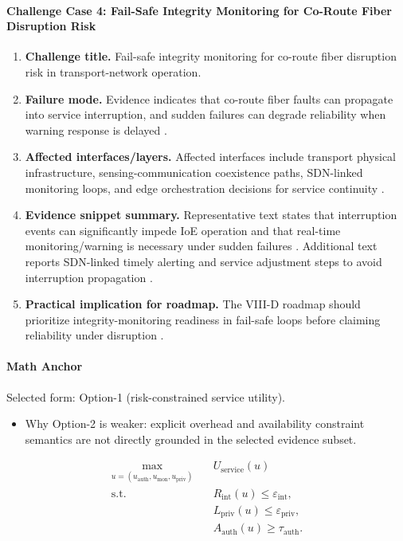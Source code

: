 \paragraph{Challenge Case 4: Fail-Safe Integrity Monitoring for Co-Route Fiber Disruption Risk}
\begin{enumerate}
    \item \textbf{Challenge title.} Fail-safe integrity monitoring for co-route fiber disruption risk in transport-network operation.
    \item \textbf{Failure mode.} Evidence indicates that co-route fiber faults can propagate into service interruption, and sudden failures can degrade reliability when warning response is delayed \cite{O_ISAC_041}.
    \item \textbf{Affected interfaces/layers.} Affected interfaces include transport physical infrastructure, sensing-communication coexistence paths, SDN-linked monitoring loops, and edge orchestration decisions for service continuity \cite{O_ISAC_041}.
    \item \textbf{Evidence snippet summary.} Representative text states that interruption events can significantly impede IoE operation and that real-time monitoring/warning is necessary under sudden failures \cite{O_ISAC_041}. Additional text reports SDN-linked timely alerting and service adjustment steps to avoid interruption propagation \cite{O_ISAC_041}.
    \item \textbf{Practical implication for roadmap.} The VIII-D roadmap should prioritize integrity-monitoring readiness in fail-safe loops before claiming reliability under disruption \cite{O_ISAC_041}.
\end{enumerate}

\paragraph{Math Anchor}
Selected form: Option-1 (risk-constrained service utility).
\begin{itemize}
    \item Why Option-2 is weaker: explicit overhead and availability constraint semantics are not directly grounded in the selected evidence subset.
\end{itemize}

\[
\begin{aligned}
\max_{u=(u_{\mathrm{auth}},u_{\mathrm{mon}},u_{\mathrm{priv}})} \quad & U_{\mathrm{service}}(u) \\
\text{s.t.} \quad & R_{\mathrm{int}}(u) \le \varepsilon_{\mathrm{int}}, \\
& L_{\mathrm{priv}}(u) \le \varepsilon_{\mathrm{priv}}, \\
& A_{\mathrm{auth}}(u) \ge \tau_{\mathrm{auth}}.
\end{aligned}
\]

